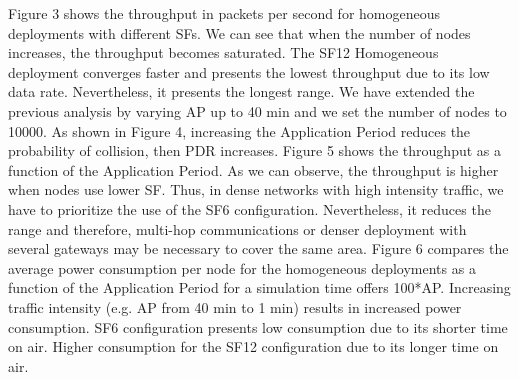 Figure 3 shows the throughput in packets per second for homogeneous deployments with different SFs.
We can see that when the number of nodes increases,
	the throughput becomes saturated.
The SF12 Homogeneous deployment converges faster and presents the lowest throughput due to its low data rate.
Nevertheless,
	it presents the longest range.
We have extended the previous analysis by varying AP up to 40 min and we set the number of nodes to 10000.
As shown in Figure 4,
	increasing the Application Period reduces the probability of collision,
	then PDR increases.
Figure 5 shows the throughput as a function of the Application Period.
As we can observe,
	the throughput is higher when nodes use lower SF.
Thus,
	in dense networks with high intensity traffic,
	we have to prioritize the use of the SF6 configuration.
Nevertheless,
	it reduces the range and therefore,
	multi-hop communications or denser deployment with several gateways may be necessary to cover the same area.
Figure 6 compares the average power consumption per node for the homogeneous deployments as a function of the Application Period for a simulation time offers 100*AP.
Increasing traffic intensity (e.g. AP from 40 min to 1 min) results in increased power consumption.
SF6 configuration presents low consumption due to its shorter time on air.
Higher consumption for the SF12 configuration due to its longer time on air.

